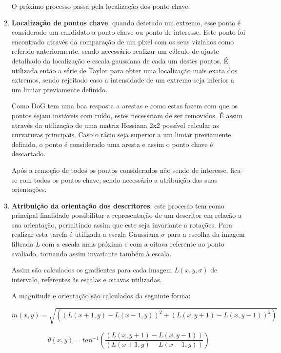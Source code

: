 \begin{enumerate}
O próximo processo passa pela localização dos ponto chave.

\item \textbf{Localização de pontos chave}: quando detetado um extremo, esse ponto é considerado um candidato a ponto chave ou ponto de interesse. Este ponto foi encontrado através da comparação de um pixel com os seus vizinhos como referido anteriormente. sendo necessário realizar um cálculo de ajuste detalhado da localização e escala gaussiana de cada um destes pontos. É utilizada então a série de Taylor para obter uma localização mais exata dos extremos, sendo rejeitado caso a intensidade de um extremo seja inferior a um limiar previamente definido. 

Como DoG tem uma boa resposta a arestas e como estas fazem com que os pontos sejam instáveis com ruído, estes necessitam de ser removidos. É assim através da utilização de uma matriz Hessiana 2x2 possível calcular as curvaturas principais. Caso o rácio seja superior a um limiar previamente definido, o ponto é considerado uma aresta e assim o ponto chave é descartado.

Após a remoção de todos os pontos considerados não sendo de interesse, fica-se com todos os pontos chave, sendo necessário a atribuição das suas orientações. 

\item \textbf{Atribuição da orientação dos descritores}: este processo tem como principal finalidade possibilitar a representação de um descritor em relação a sua orientação, permitindo assim que este seja invariante a rotações. Para realizar esta tarefa é utilizada a escala Gaussiana $ \sigma $ para a escolha da imagem filtrada \textit{L} com a escala mais próxima e com a oitava referente ao ponto avaliado, tornando assim invariante também à escala.

Assim são calculados os gradientes para cada imagem $ L(x, y, \sigma) $ de intervalo, referentes às escalas e oitavas utilizadas.

A magnitude e orientação são calculados da seguinte forma:

\begin{equation}
m(x,y) = \sqrt{\left ( \left ( L(x+1, y) - L(x-1, y) \right )^2 + \left ( L(x, y+1) - L(x, y-1) \right )^2  \right )}
\end{equation}

\begin{equation}
\theta (x, y) = tan^{-1}\left ( \frac{\left ( L(x, y+1) - L(x, y-1) \right )}{\left ( L(x+1, y) - L(x-1, y) \right )} \right )
\end{equation}


\end{enumerate}
